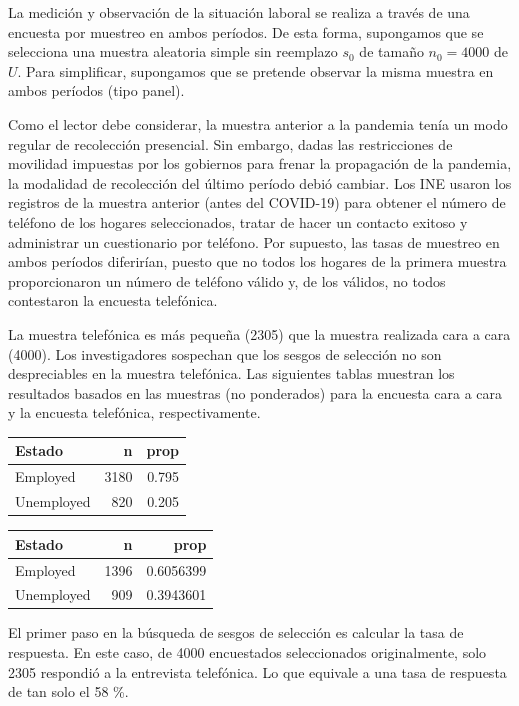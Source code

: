 \documentclass[
  12pt,
  spanish,
]{book}
\begin{document}
La medición y observación de la situación laboral se realiza a través de una encuesta por muestreo en ambos períodos. De esta forma, supongamos que se selecciona una muestra aleatoria simple sin reemplazo \(s_0\) de tamaño \(n_0 = 4000\) de \(U\). Para simplificar, supongamos que se pretende observar la misma muestra en ambos períodos (tipo panel).

Como el lector debe considerar, la muestra anterior a la pandemia tenía un modo regular de recolección presencial. Sin embargo, dadas las restricciones de movilidad impuestas por los gobiernos para frenar la propagación de la pandemia, la modalidad de recolección del último período debió cambiar. Los INE usaron los registros de la muestra anterior (antes del COVID-19) para obtener el número de teléfono de los hogares seleccionados, tratar de hacer un contacto exitoso y administrar un cuestionario por teléfono. Por supuesto, las tasas de muestreo en ambos períodos diferirían, puesto que no todos los hogares de la primera muestra proporcionaron un número de teléfono válido y, de los válidos, no todos contestaron la encuesta telefónica.

La muestra telefónica es más pequeña (2305) que la muestra realizada cara a cara (4000). Los investigadores sospechan que los sesgos de selección no son despreciables en la muestra telefónica. Las siguientes tablas muestran los resultados basados en las muestras (no ponderados) para la encuesta cara a cara y la encuesta telefónica, respectivamente.

\captionsetup[table]{labelformat=empty,skip=1pt}
\begin{longtable}{lrr}
\toprule
Estado & n & prop \\ 
\midrule
Employed & 3180 & 0.795 \\ 
Unemployed & 820 & 0.205 \\ 
 \bottomrule
\end{longtable}
\captionsetup[table]{labelformat=empty,skip=1pt}
\begin{longtable}{lrr}
\toprule
Estado & n & prop \\ 
\midrule
Employed & 1396 & 0.6056399 \\ 
Unemployed & 909 & 0.3943601 \\ 
 \bottomrule
\end{longtable}

El primer paso en la búsqueda de sesgos de selección es calcular la tasa de respuesta. En este caso, de 4000 encuestados seleccionados originalmente, solo 2305 respondió a la entrevista telefónica. Lo que equivale a una tasa de respuesta de tan solo el 58 \%.
\end{document}
